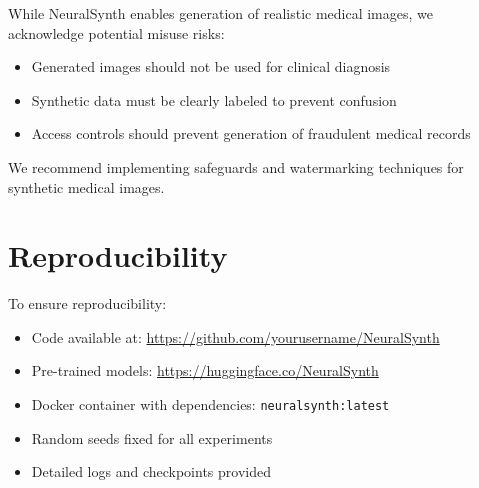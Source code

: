 \documentclass[10pt,twocolumn,letterpaper]{article}
\begin{document}
While NeuralSynth enables generation of realistic medical images, we acknowledge potential misuse risks:
\begin{itemize}
    \item Generated images should not be used for clinical diagnosis
    \item Synthetic data must be clearly labeled to prevent confusion
    \item Access controls should prevent generation of fraudulent medical records
\end{itemize}

We recommend implementing safeguards and watermarking techniques for synthetic medical images.

\section{Reproducibility}
\label{app:reproducibility}

To ensure reproducibility:
\begin{itemize}
    \item Code available at: \url{https://github.com/yourusername/NeuralSynth}
    \item Pre-trained models: \url{https://huggingface.co/NeuralSynth}
    \item Docker container with dependencies: \texttt{neuralsynth:latest}
    \item Random seeds fixed for all experiments
    \item Detailed logs and checkpoints provided
\end{itemize}
\end{document}
